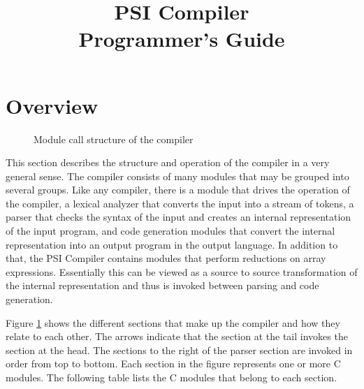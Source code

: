 
\addtolength{\topmargin}{-.75in}
\addtolength{\textwidth}{1.6in}
\setlength{\textheight}{8.75in}
\addtolength{\oddsidemargin}{-0.75in}
\addtolength{\evensidemargin}{-0.75in}
\setlength{\parskip}{.1in}

\newcommand{\cat}{+\!\!\!\!+}
\newcommand{\take}{\,\bigtriangleup\,}
\newcommand{\drop}{\,\bigtriangledown\,}
\newcommand{\karate}{\!\widehat{\hbox to 10pt{}}\!}
\newcommand{\rshp}{\widehat{\rho}}

\title{PSI Compiler\\Programmer's Guide}
\author{}


\maketitle
\tableofcontents

\section{Overview}
\begin{figure}
\begin{center}
\leavevmode
{}
\end{center}
\caption{Module call structure of the compiler}
\label{structure}
\end{figure}
  This section describes the structure and operation of the compiler in
a very general sense.  The compiler consists of many modules that may be
grouped into several groups.  Like any compiler, there is a module
that drives the operation of the compiler, a lexical analyzer that converts
the input into a stream of tokens, a parser that checks the syntax of the
input and creates an internal representation of the input program, and
code generation modules that convert the internal representation into
an output program in the output language.  In addition to that, the PSI 
Compiler contains modules that perform reductions on array expressions.
Essentially this can be viewed as a source to source transformation of the
internal representation and thus is invoked between parsing and code 
generation.  

Figure \ref{structure} shows the different sections that make up
the compiler and how they relate to each other.  The arrows indicate that
the section at the tail invokes the section at the head.  The sections to
the right of the parser section are invoked in order from top to bottom.  Each
section in the figure represents one or more C modules.  The following
table lists the C modules that belong to each section.

